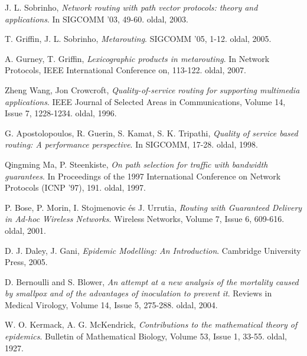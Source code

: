 \begin{thebibliography}{9}
 J. L. Sobrinho, \emph {Network routing with path vector protocols: theory and applications}.
In SIGCOMM '03, 49-60. oldal, 2003.

 T. Griffin, J. L. Sobrinho, \emph {Metarouting}.
SIGCOMM '05, 1-12. oldal, 2005.

 A. Gurney, T. Griffin, \emph {Lexicographic products in metarouting}.
In Network Protocols, IEEE International Conference on, 113-122. oldal, 2007.

 Zheng Wang, Jon Crowcroft, \emph {Quality-of-service routing for supporting multimedia applications}.
IEEE Journal of Selected Areas in Communications, Volume 14, Issue 7, 1228-1234. oldal, 1996.

 G. Apostolopoulos, R. Guerin, S. Kamat, S. K. Tripathi, \emph {Quality of service based routing: A performance perspective}.
In SIGCOMM, 17-28. oldal, 1998.

 Qingming Ma, P. Steenkiste, \emph {On path selection for traffic with bandwidth guarantees}.
In Proceedings of the 1997 International Conference on Network Protocols (ICNP '97), 191. oldal, 1997.

 P. Bose, P. Morin, I. Stojmenovic és J. Urrutia, \emph {Routing with Guaranteed Delivery in Ad-hoc Wireless Networks}.
Wireless Networks, Volume 7, Issue 6, 609-616. oldal, 2001.

%
%

 D. J. Daley, J. Gani, \emph {Epidemic Modelling: An Introduction}.
Cambridge University Press, 2005.

 D. Bernoulli and S. Blower, \emph {An attempt at a new analysis of the mortality caused by smallpox and of the advantages of inoculation to prevent it}.
Reviews in Medical Virology, Volume 14, Issue 5, 275-288. oldal, 2004.

 W. O. Kermack, A. G. McKendrick, \emph {Contributions to the mathematical theory of epidemics}.
Bulletin of Mathematical Biology, Volume 53, Issue 1, 33-55. oldal, 1927.


\end{thebibliography}
